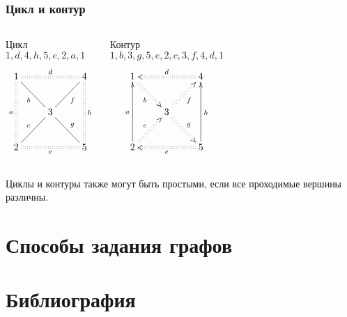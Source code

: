 \begin{frame}
    \frametitle{Цикл и контур}

    \begin{columns}
            \begin{block}{Цикл \\$1,d,4,h,5,e,2,a,1$}
                \[
                    {\xymatrix{
                        1 \ar@{:}[dd]_{a} \ar@{:}[rr]^{d} \ar@{-}[dr]_{b}
                            &*{}
                                &4 \ar@{:}[dd]^{h}
                                    \\
                        *{} 
                            &3 \ar@{-}[ur]_{f} \ar@{-}[dr]^{g}
                                &*{}
                                    \\
                        2  \ar@{-}[ur]^{c} \ar@{:}[rr]_{e}
                            &*{}
                                &5
                    }}
                \]
            \end{block}
        
            \begin{block}{Контур\\$1,b,3,g,5,e,2,c,3,f,4,d,1$}
                \[
                    {\xymatrix{
                        1 \ar@{<-}[dd]_{a} \ar@{<:}[rr]^{d} \ar@{:>}[dr]_{b}
                            &*{}
                                &4 \ar@{<-}[dd]^{h}
                                    \\
                        *{} 
                            &3 \ar@{:>}[ur]_{f} \ar@{:>}[dr]^{g}
                                &*{}
                                    \\
                        2  \ar@{:>}[ur]^{c} \ar@{<:}[rr]_{e}
                            &*{}
                                &5
                    }}
                \]
            \end{block}
    \end{columns}    
    Циклы и контуры также могут быть \alert{простыми}, если все проходимые вершины различны.
\end{frame}

\section{Способы задания графов}

\appendix

\section{Библиография}

